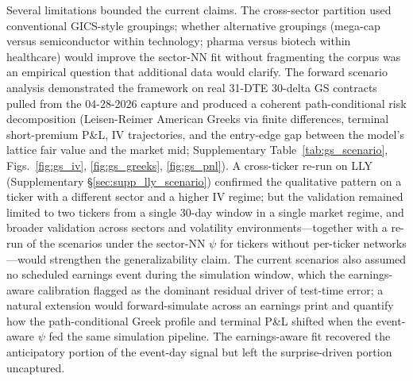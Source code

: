 Several limitations bounded the current claims. The cross-sector partition used conventional GICS-style groupings; whether alternative groupings (mega-cap versus semiconductor within technology; pharma versus biotech within healthcare) would improve the sector-NN fit without fragmenting the corpus was an empirical question that additional data would clarify. The forward scenario analysis demonstrated the framework on real 31-DTE 30-delta GS contracts pulled from the 04-28-2026 capture and produced a coherent path-conditional risk decomposition (Leisen-Reimer American Greeks via finite differences, terminal short-premium P\&L, IV trajectories, and the entry-edge gap between the model's lattice fair value and the market mid; Supplementary Table~\ref{tab:gs_scenario}, Figs.~\ref{fig:gs_iv}, \ref{fig:gs_greeks}, \ref{fig:gs_pnl}). A cross-ticker re-run on LLY (Supplementary §\ref{sec:supp_lly_scenario}) confirmed the qualitative pattern on a ticker with a different sector and a higher IV regime; but the validation remained limited to two tickers from a single 30-day window in a single market regime, and broader validation across sectors and volatility environments---together with a re-run of the scenarios under the sector-NN $\psi$ for tickers without per-ticker networks---would strengthen the generalizability claim. The current scenarios also assumed no scheduled earnings event during the simulation window, which the earnings-aware calibration flagged as the dominant residual driver of test-time error; a natural extension would forward-simulate across an earnings print and quantify how the path-conditional Greek profile and terminal P\&L shifted when the event-aware $\psi$ fed the same simulation pipeline. The earnings-aware fit recovered the anticipatory portion of the event-day signal but left the surprise-driven portion uncaptured.

